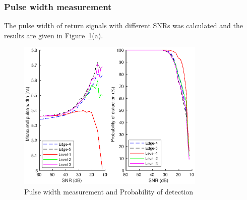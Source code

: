 \subsubsection{Pulse width measurement}
The pulse width of return signals with different SNRs was calculated and the results are given in Figure~\ref{fig:bm_pw}(a).
\begin{figure}[htbp] %
\centering
\graphicspath{ {figures/} }
\includegraphics[width=0.8\textwidth]{figures/chapter6_ADC/pd_pw_snr_all.eps}
\caption{Pulse width measurement and Probability of detection}
\label{fig:bm_pw}
\end{figure}
